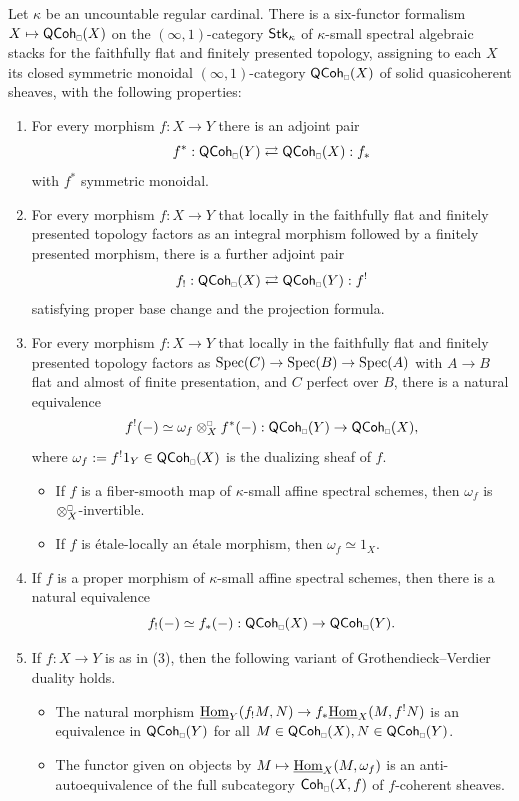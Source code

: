 \begin{theorem*}[\ref{thm: main six-functor formalism}]
    Let $\kappa$ be an uncountable regular cardinal. There is a six-functor formalism $X\mapsto\QCoh_{\sld}(X)$ on the $(\infty,1)$-category $\mathsf{Stk}_{\kappa}$ of $\kappa$-small spectral algebraic stacks for the faithfully flat and finitely presented topology, assigning to each $X$ its closed symmetric monoidal $(\infty,1)$-category $\QCoh_{\sld}(X)$ of solid quasicoherent sheaves, with the following properties:
    \begin{enumerate}
        \item For every morphism $f: X\to Y$ there is an adjoint pair
        $$f^{*}:\QCoh_{\sld}(Y)\rightleftarrows\QCoh_{\sld}(X): f_{*}$$
        with $f^{*}$ symmetric monoidal.
        \item For every morphism $f: X\to Y$ that locally in the faithfully flat and finitely presented topology factors as an integral morphism followed by a finitely presented morphism, there is a further adjoint pair
        $$f_{!}:\QCoh_{\sld}(X)\rightleftarrows\QCoh_{\sld}(Y): f^{!}$$
        satisfying proper base change and the projection formula.
        \item For every morphism $f: X\to Y$ that locally in the faithfully flat and finitely presented topology factors as $\operatorname{Spec}(C)\to\operatorname{Spec}(B)\to\operatorname{Spec}(A)$ with $A\to B$ flat and almost of finite presentation, and $C$ perfect over $B$, there is a natural equivalence
        $$f^{!}(-)\simeq\omega_{f}\otimes_{X}^{\sld}f^{*}(-):\QCoh_{\sld}(Y)\to\QCoh_{\sld}(X),$$
        where $\omega_{f}:=f^{!}1_{Y}\in\QCoh_{\sld}(X)$ is the dualizing sheaf of $f$.
        \begin{itemize}
            \item[(3.1)] If $f$ is a fiber-smooth map of $\kappa$-small affine spectral schemes, then $\omega_{f}$ is $\otimes_{X}^{\sld}$-invertible.
            \item[(3.2)] If $f$ is \'{e}tale-locally an \'{e}tale morphism, then $\omega_{f}\simeq1_{X}$.
        \end{itemize}
        \item If $f$ is a proper morphism of $\kappa$-small affine spectral schemes, then there is a natural equivalence
        $$f_{!}(-)\simeq f_{*}(-):\QCoh_{\sld}(X)\to\QCoh_{\sld}(Y).$$
        \item If $f: X\to Y$ is as in (3), then the following variant of Grothendieck--Verdier duality holds.
        \begin{itemize}
            \item[(5.1)] The natural morphism $\underline{\mathrm{Hom}}_{Y}(f_{!}M,N)\to f_{*}\underline{\mathrm{Hom}}_{X}(M,f^{!}N)$ is an equivalence in $\QCoh_{\sld}(Y)$ for all $M\in\QCoh_{\sld}(X),N\in\QCoh_{\sld}(Y)$.
            \item[(5.2)] The functor given on objects by $M\mapsto\underline{\mathrm{Hom}}_{X}(M,\omega_{f})$ is an anti-autoequivalence of the full subcategory $\Coh_{\sld}(X,f)$ of $f$-coherent sheaves.
        \end{itemize}
    \end{enumerate}
\end{theorem*}
